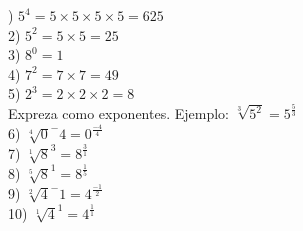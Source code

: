 \documentclass[a4paper,12pt]{article}
\begin{document}
 ) $5^4=5\times 5\times 5\times  5=625$ \vspace{1cm}\\ 
2) $5^2=5\times  5=25$ \vspace{1cm}\\ 
3) $8^0= 1$ \vspace{1cm}\\ 
4) $7^2=7\times  7=49$ \vspace{1cm}\\ 
5) $2^3=2\times 2\times  2=8$ \vspace{1cm}\\ 
 Expreza como exponentes.
 Ejemplo: $\sqrt[3]{5^2}=5^\frac{5}{3} $  \vspace{0.5cm}\\ 
6) $\sqrt[4]{0}^-4=0^\frac{-4}{4 }$\vspace{1cm}\\ 
7) $\sqrt[1]{8}^3=8^\frac{3}{1 }$\vspace{1cm}\\ 
8) $\sqrt[5]{8}^1=8^\frac{1}{5 }$\vspace{1cm}\\ 
9) $\sqrt[2]{4}^-1=4^\frac{-1}{2 }$\vspace{1cm}\\ 
10) $\sqrt[1]{4}^1=4^\frac{1}{1 }$\vspace{1cm}\\ 

 \pagebreak 
\end{document}
